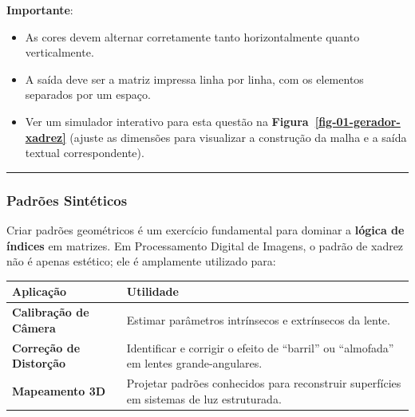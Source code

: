 \documentclass[
  portuguese,
  letterpaper,
  openany,
  oneside,
  12pt,
  a4paper]{book}
\providecommand{\tightlist}{%
  \setlength{\itemsep}{0pt}\setlength{\parskip}{0pt}}
\begin{document}
 \textbf{Importante}:

\begin{itemize}
\tightlist
\item
  As cores devem alternar corretamente tanto horizontalmente quanto
  verticalmente.
\item
  A saída deve ser a matriz impressa linha por linha, com os elementos
  separados por um espaço.
\item
  Ver um simulador interativo para esta questão na
  \textbf{Figura~\ref{fig-01-gerador-xadrez}} (ajuste as dimensões para
  visualizar a construção da malha e a saída textual correspondente).
\end{itemize}

\begin{center}\rule{0.5\linewidth}{0.5pt}\end{center}

\subsubsection{\texorpdfstring{ Padrões
Sintéticos}{ Padrões Sintéticos}}\label{padruxf5es-sintuxe9ticos}

Criar padrões geométricos é um exercício fundamental para dominar a
\textbf{lógica de índices} em matrizes. Em Processamento Digital de
Imagens, o padrão de xadrez não é apenas estético; ele é amplamente
utilizado para:

\begin{longtable}[]{@{}
  >{\raggedright\arraybackslash}p{}
  >{\raggedright\arraybackslash}p{}@{}}
\toprule\noalign{}
\begin{minipage}[b]{\linewidth}\raggedright
Aplicação
\end{minipage} & \begin{minipage}[b]{\linewidth}\raggedright
Utilidade
\end{minipage} \\
\midrule\noalign{}
\endhead
\bottomrule\noalign{}
\endlastfoot
\textbf{Calibração de Câmera} & Estimar parâmetros intrínsecos e
extrínsecos da lente. \\
\textbf{Correção de Distorção} & Identificar e corrigir o efeito de
``barril'' ou ``almofada'' em lentes grande-angulares. \\
\textbf{Mapeamento 3D} & Projetar padrões conhecidos para reconstruir
superfícies em sistemas de luz estruturada. \\
\end{longtable}
\end{document}
